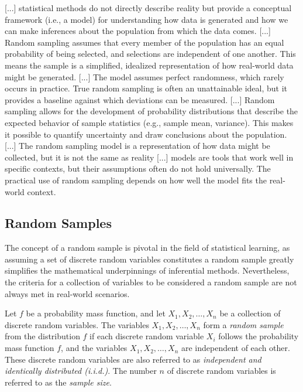 {\color{red} [...] statistical methods do not directly describe reality but provide a conceptual framework (i.e., a model) for understanding how data is generated and how we can make inferences about the population from which the data comes. [...] Random sampling assumes that every member of the population has an equal probability of being selected, and selections are independent of one another. This means the sample is a simplified, idealized representation of how real-world data might be generated. [...] The model assumes perfect randomness, which rarely occurs in practice. True random sampling is often an unattainable ideal, but it provides a baseline against which deviations can be measured. [...] Random sampling allows for the development of probability distributions that describe the expected behavior of sample statistics (e.g., sample mean, variance). This makes it possible to quantify uncertainty and draw conclusions about the population. [...] The random sampling model is a representation of how data might be collected, but it is not the same as reality [...] models are tools that work well in specific contexts, but their assumptions often do not hold universally. The practical use of random sampling depends on how well the model fits the real-world context. }


\subsection{Random Samples}

The concept of a random sample is pivotal in the field of statistical learning, as assuming a set of discrete random variables constitutes a random sample greatly simplifies the mathematical underpinnings of inferential methods. Nevertheless, the criteria for a collection of variables to be considered a random sample are not always met in real-world scenarios.

\begin{definition}
Let \( f \) be a probability mass function, and let \( X_1, X_2, \ldots, X_n \) be a collection of discrete random variables. The variables \( X_1, X_2, \ldots, X_n \) form a \emph{random sample} from the distribution \( f \) if each discrete random variable \( X_i \) follows the probability mass function \( f \), and the variables \( X_1, X_2, \ldots, X_n \) are independent of each other. These discrete random variables are also referred to as \emph{independent and identically distributed (i.i.d.)}. The number \( n \) of discrete random variables is referred to as the \emph{sample size}.
\end{definition}


